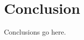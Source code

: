 \documentclass[../PhD.tex]{subfiles}
\begin{document}

\chapter{Conclusion}
\label{ch: conclusion}

Conclusions go here.

\end{document}
